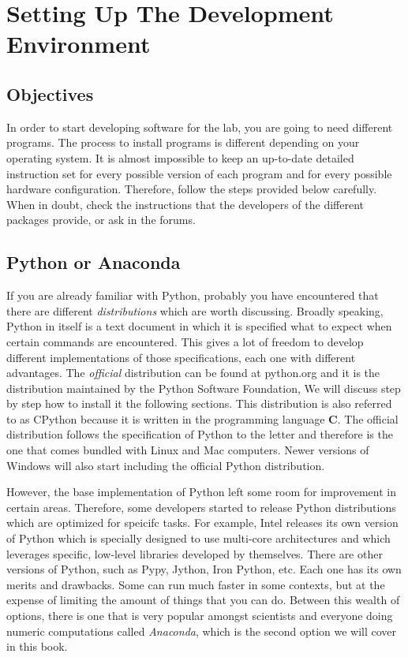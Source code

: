 \chapter{Setting Up The Development Environment}\label{chapter:setting-up}
\section{Objectives}
In order to start developing software for the lab, you are going to need different programs. The process to install programs is different depending on your operating system. It is almost impossible to keep an up-to-date detailed instruction set for every possible version of each program and for every possible hardware configuration. Therefore, follow the steps provided below carefully. When in doubt, check the instructions that the developers of the different packages provide, or ask in the forums. 

\section{Python or Anaconda}
If you are already familiar with Python, probably you have encountered that there are different \emph{distributions} which are worth discussing. Broadly speaking, Python in itself is a text document in which it is specified what to expect when certain commands are encountered. This gives a lot of freedom to develop different implementations of those specifications, each one with different advantages. The \emph{official} distribution can be found at python.org and it is the distribution maintained by the Python Software Foundation, We will discuss step by step how to install it the following sections. This distribution is also referred to as CPython because it is written in the programming language \textbf{C}. The official distribution follows the specification of Python to the letter and therefore is the one that comes bundled with Linux and Mac computers. Newer versions of Windows will also start including the official Python distribution. 

However, the base implementation of Python left some room for improvement in certain areas. Therefore, some developers started to release Python distributions which are optimized for speicifc tasks. For example, Intel releases its own version of Python which is specially designed to use multi-core architectures and which leverages specific, low-level libraries developed by themselves. There are other versions of Python, such as Pypy, Jython, Iron Python, etc. Each one has its own merits and drawbacks. Some can run much faster in some contexts, but at the expense of limiting the amount of things that you can do. Between this wealth of options, there is one that is very popular amongst scientists and everyone doing numeric computations called \emph{Anaconda}, which is the second option we will cover in this book. 

